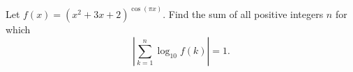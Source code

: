 Let $f(x) = (x^2+3x+2)^{\cos(\pi x)}$. Find the sum of all positive integers $n$ for which \[\left| \sum_{k=1}^n \log_{10} f(k) \right| = 1.\]